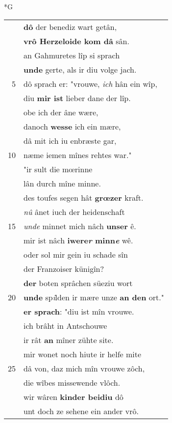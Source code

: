 \documentclass[8pt,a4paper,notitlepage]{article}
\begin{document}
\begin{table}[ht]
\begin{minipage}[t]{0.5\linewidth}
\small
\begin{center}*G
\end{center}
\begin{tabular}{rl}
 & \textbf{dô} der benediz wart getân,\\ 
 & \textbf{vrô Herzeloide kom dâ} sân.\\ 
 & an Gahmuretes lîp si sprach\\ 
 & \textbf{unde} gerte, als ir diu volge jach.\\ 
5 & dô sprach er: "vrouwe, \textit{ich} hân ein wîp,\\ 
 & diu \textbf{mir ist} lieber dane der lîp.\\ 
 & obe ich der âne wære,\\ 
 & danoch \textbf{wesse} ich ein mære,\\ 
 & dâ mit ich iu enbræste gar,\\ 
10 & næme iemen mînes rehtes war."\\ 
 & "ir sult die mœrinne\\ 
 & lân durch mîne minne.\\ 
 & des toufes segen hât \textbf{grœzer} kraft.\\ 
 & \textit{nû} ânet iuch der heidenschaft\\ 
15 & \textit{unde} minnet mich nâch \textbf{unser} ê.\\ 
 & mir ist nâch \textbf{iwere\textit{r} minn\textit{e}} wê.\\ 
 & oder sol mir gein iu schade sîn\\ 
 & der Franzoiser künigîn?\\ 
 & \textbf{der} boten sprâchen süeziu wort\\ 
20 & \textbf{unde} sp\textit{i}lden ir mære unze \textbf{an den} ort."\\ 
 & \textbf{er sprach}: "diu ist mîn vrouwe.\\ 
 & ich brâht in Antschouwe\\ 
 & ir rât \textbf{an} mîner zühte site.\\ 
 & mir wonet noch hiute ir helfe mite\\ 
25 & dâ von, daz mich mîn vrouwe zôch,\\ 
 & die wîbes missewende vlôch.\\ 
 & wir wâren \textbf{kinder beidiu} dô\\ 
 & unt doch ze sehene ein ander vrô.\\ 

\end{tabular}
\end{minipage}
\end{table}
\end{document}
